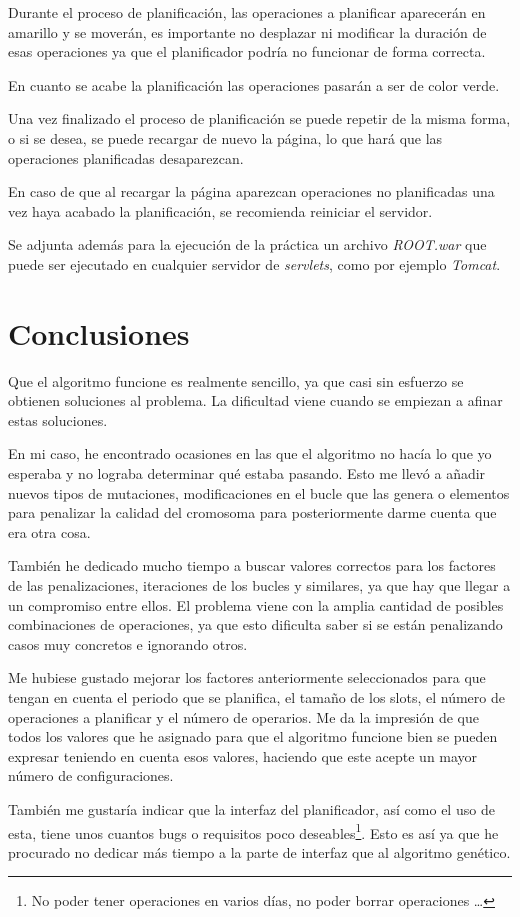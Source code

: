 \documentclass[11pt]{article}
\begin{document}
	Durante el proceso de planificación, las operaciones a planificar aparecerán en amarillo y se moverán, es importante no desplazar ni modificar la duración de esas operaciones ya que el planificador podría no funcionar de forma correcta.
	
	En cuanto se acabe la planificación las operaciones pasarán a ser de color verde.
	
	Una vez finalizado el proceso de planificación se puede repetir de la misma forma, o si se desea, se puede recargar de nuevo la página, lo que hará que las operaciones planificadas desaparezcan. 
	
	En caso de que al recargar la página aparezcan operaciones no planificadas una vez haya acabado la planificación, se recomienda reiniciar el servidor.
	
	Se adjunta además para la ejecución de la práctica un archivo \textit{ROOT.war} que puede ser ejecutado en cualquier servidor de \textit{servlets}, como por ejemplo \textit{Tomcat}.
	
	\section{Conclusiones}
	
	Que el algoritmo funcione es realmente sencillo, ya que casi sin esfuerzo se obtienen soluciones al problema. La dificultad viene cuando se empiezan a afinar estas soluciones.
	
	En mi caso, he encontrado ocasiones en las que el algoritmo no hacía lo que yo esperaba y no lograba determinar qué estaba pasando. Esto me llevó a añadir nuevos tipos de mutaciones, modificaciones en el bucle que las genera o elementos para penalizar la calidad del cromosoma para posteriormente darme cuenta que era otra cosa.
	
	También he dedicado mucho tiempo a buscar valores correctos para los factores de las penalizaciones, iteraciones de los bucles y similares, ya que hay que llegar a un compromiso entre ellos. El problema viene con la amplia cantidad de posibles combinaciones de operaciones, ya que esto dificulta saber si se están penalizando casos muy concretos e ignorando otros.
	
	Me hubiese gustado mejorar los factores anteriormente seleccionados para que tengan en cuenta el periodo que se planifica, el tamaño de los slots, el número de operaciones a planificar y el número de operarios. Me da la impresión de que todos los valores que he asignado para que el algoritmo funcione bien se pueden expresar teniendo en cuenta esos valores, haciendo que este acepte un mayor número de configuraciones.
	
	También me gustaría indicar que la interfaz del planificador, así como el uso de esta, tiene unos cuantos bugs o requisitos poco deseables\footnote{No poder tener operaciones en varios días, no poder borrar operaciones \ldots}. Esto es así ya que he procurado no dedicar más tiempo a la parte de interfaz que al algoritmo genético.
	
\end{document}
